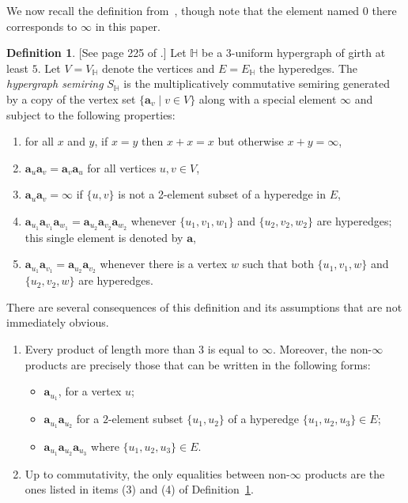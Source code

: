 \documentclass[eqnor,reqno]{amsart}
\theoremstyle{plain}
\theoremstyle{definition}
\newtheorem{defn}[thm]{Definition}
\begin{document}
We now recall the definition from~\cite{JRZ}, though note that the element named $0$ there corresponds to $\infty$ in this paper.
\begin{defn}\label{defn:hypergraph} [See page 225 of \cite{JRZ}.]
Let $\mathbb{H}$ be a $3$-uniform hypergraph of girth at least $5$.  Let $V=V_\mathbb{H}$ denote the vertices and $E=E_\mathbb{H}$ the hyperedges. The \emph{hypergraph semiring} $S_\mathbb{H}$ is the multiplicatively commutative semiring generated by a copy of the vertex set $\{\mathbf{a}_v\mid v\in V\}$ along with a special element $\infty$ and subject to the following properties:
\begin{enumerate}
\item for all $x$ and $y$, if $x=y$ then $x+x=x$ but otherwise $x+y=\infty$,
\item  $\mathbf{a}_u\mathbf{a}_v=\mathbf{a}_v\mathbf{a}_u$ for all vertices $u,v\in V$,
\item $\mathbf{a}_u\mathbf{a}_v=\infty$ if $\{u,v\}$ is not a 2-element subset of a hyperedge in $E$,
\item $\mathbf{a}_{u_1}\mathbf{a}_{v_1}\mathbf{a}_{w_1}=\mathbf{a}_{u_2}\mathbf{a}_{v_2}\mathbf{a}_{w_2}$ whenever $\{u_1,v_1,w_1\}$ and $\{u_2,v_2,w_2\}$ are hyperedges; this single element is denoted by $\mathbf{a}$,
\item $\mathbf{a}_{u_1}\mathbf{a}_{v_1}=\mathbf{a}_{u_2}\mathbf{a}_{v_2}$ whenever there is a vertex $w$ such that both $\{u_1,v_1,w\}$ and $\{u_2,v_2,w\}$ are hyperedges.
\end{enumerate}
\end{defn}
There are several consequences of this definition and its assumptions that are not immediately obvious.  
\begin{enumerate}
\item[(a)] Every product of length more than $3$ is equal to $\infty$.   Moreover, the non-$\infty$ products are precisely those that can be written in the following forms:
\begin{itemize}
\item[(i)] $\mathbf{a}_{u_1}$, for a vertex $u$;
\item[(ii)] $\mathbf{a}_{u_1}\mathbf{a}_{u_2}$ for a $2$-element subset $\{u_1,u_2\}$ of a hyperedge $\{u_1,u_2,u_3\}\in E$;
\item[(iii)] $\mathbf{a}_{u_1}\mathbf{a}_{u_2}\mathbf{a}_{u_3}$ where $\{u_1,u_2,u_3\}\in E$.
\end{itemize} 
\item[(b)] Up to commutativity, the only equalities between non-$\infty$ products are the ones listed in items (3) and (4) of Definition~\ref{defn:hypergraph}.
\end{enumerate}
\end{document}
